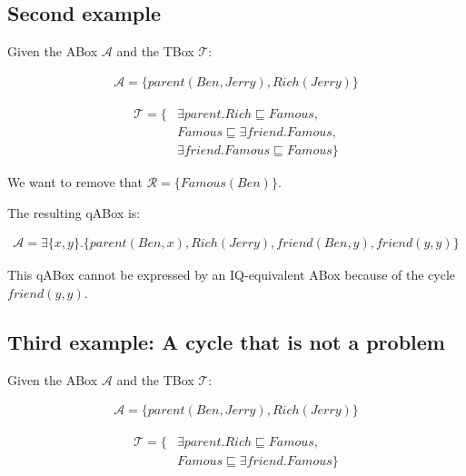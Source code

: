 \subsection{Second example}

Given the ABox $\mathcal{A}$ and the TBox $\mathcal{T}$:

\begin{equation*}
    \begin{aligned}
        \mathcal{A} = \{ parent(Ben, Jerry), Rich(Jerry) \}
    \end{aligned}
\end{equation*}

\begin{equation*}
    \begin{aligned}
        \mathcal{T} = \{ & \exists parent.Rich \sqsubseteq Famous,   \\
                         & Famous \sqsubseteq \exists friend.Famous, \\ 
                         & \exists friend.Famous \sqsubseteq Famous  \}
    \end{aligned}
\end{equation*}

We want to remove that $\mathcal{R} = \{ Famous(Ben) \}$. 

The resulting qABox is:

\begin{equation*}
    \begin{aligned}
        \mathcal{A} = \exists \{ x, y \}.\{ parent(Ben, x), Rich(Jerry), friend(Ben, y), friend(y, y) \}
    \end{aligned}
\end{equation*}

This qABox cannot be expressed by an IQ-equivalent ABox because of the cycle $friend(y,y)$.

\subsection{Third example: A cycle that is not a problem}

Given the ABox $\mathcal{A}$ and the TBox $\mathcal{T}$:

\begin{equation*}
    \begin{aligned}
        \mathcal{A} = \{ parent(Ben, Jerry), Rich(Jerry) \}
    \end{aligned}
\end{equation*}

\begin{equation*}
    \begin{aligned}
        \mathcal{T} = \{ & \exists parent.Rich \sqsubseteq Famous,  \\
                         & Famous \sqsubseteq \exists friend.Famous \}
    \end{aligned}
\end{equation*}


